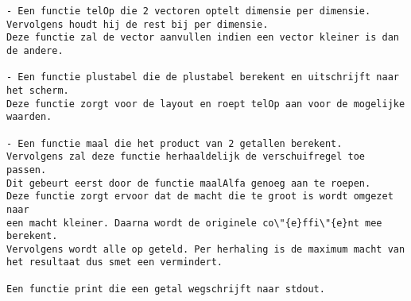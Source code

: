 \documentclass[11pt]{article}
\begin{document}
\begin{itemize}
\begin{Verbatim}[frame=single]
- Een functie telOp die 2 vectoren optelt dimensie per dimensie.
Vervolgens houdt hij de rest bij per dimensie.
Deze functie zal de vector aanvullen indien een vector kleiner is dan de andere.

- Een functie plustabel die de plustabel berekent en uitschrijft naar het scherm.
Deze functie zorgt voor de layout en roept telOp aan voor de mogelijke waarden.

- Een functie maal die het product van 2 getallen berekent.
Vervolgens zal deze functie herhaaldelijk de verschuifregel toe passen.
Dit gebeurt eerst door de functie maalAlfa genoeg aan te roepen.
Deze functie zorgt ervoor dat de macht die te groot is wordt omgezet naar 
een macht kleiner. Daarna wordt de originele co\"{e}ffi\"{e}nt mee berekent.
Vervolgens wordt alle op geteld. Per herhaling is de maximum macht van
het resultaat dus smet een vermindert.

Een functie print die een getal wegschrijft naar stdout.

\end{Verbatim}

\end{itemize}
%
\end{document}
